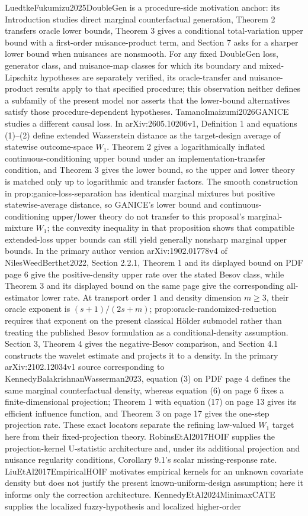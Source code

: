 \documentclass{article}
\begin{document}
LuedtkeFukumizu2025DoubleGen is a procedure-side motivation anchor: its Introduction studies direct marginal counterfactual generation, Theorem 2 transfers oracle lower bounds, Theorem 3 gives a conditional total-variation upper bound with a first-order nuisance-product term, and Section 7 asks for a sharper lower bound when nuisances are nonsmooth. For any fixed DoubleGen loss, generator class, and nuisance-map classes for which its boundary and mixed-Lipschitz hypotheses are separately verified, its oracle-transfer and nuisance-product results apply to that specified procedure; this observation neither defines a subfamily of the present model nor asserts that the lower-bound alternatives satisfy those procedure-dependent hypotheses. TamanoImaizumi2026GANICE studies a different causal loss. In arXiv:2605.10206v1, Definition 1 and equations (1)--(2) define extended Wasserstein distance as the target-design average of statewise outcome-space \(W_1\). Theorem 2 gives a logarithmically inflated continuous-conditioning upper bound under an implementation-transfer condition, and Theorem 3 gives the lower bound, so the upper and lower theory is matched only up to logarithmic and transfer factors. The smooth construction in prop:ganice-loss-separation has identical marginal mixtures but positive statewise-average distance, so GANICE's lower bound and continuous-conditioning upper/lower theory do not transfer to this proposal's marginal-mixture \(W_1\); the convexity inequality in that proposition shows that compatible extended-loss upper bounds can still yield generally nonsharp marginal upper bounds. In the primary author version arXiv:1902.01778v4 of NilesWeedBerthet2022, Section 2.2.1, Theorem 1 and its displayed bound on PDF page 6 give the positive-density upper rate over the stated Besov class, while Theorem 3 and its displayed bound on the same page give the corresponding all-estimator lower rate. At transport order \(1\) and density dimension \(m\ge3\), their oracle exponent is \((s+1)/(2s+m)\); prop:oracle-randomized-reduction requires that exponent on the present classical Hölder submodel rather than treating the published Besov formulation as a conditional-density assumption. Section 3, Theorem 4 gives the negative-Besov comparison, and Section 4.1 constructs the wavelet estimate and projects it to a density. In the primary arXiv:2102.12034v1 source corresponding to KennedyBalakrishnanWasserman2023, equation (3) on PDF page 4 defines the same marginal counterfactual density, whereas equation (6) on page 6 fixes a finite-dimensional projection; Theorem 1 with equation (17) on page 13 gives its efficient influence function, and Theorem 3 on page 17 gives the one-step projection rate. These exact locators separate the refining law-valued \(W_1\) target here from their fixed-projection theory. RobinsEtAl2017HOIF supplies the projection-kernel U-statistic architecture and, under its additional projection and nuisance regularity conditions, Corollary 9.1's scalar missing-response rate. LiuEtAl2017EmpiricalHOIF motivates empirical kernels for an unknown covariate density but does not justify the present known-uniform-design assumption; here it informs only the correction architecture. KennedyEtAl2024MinimaxCATE supplies the localized fuzzy-hypothesis and localized higher-order 
\end{document}
